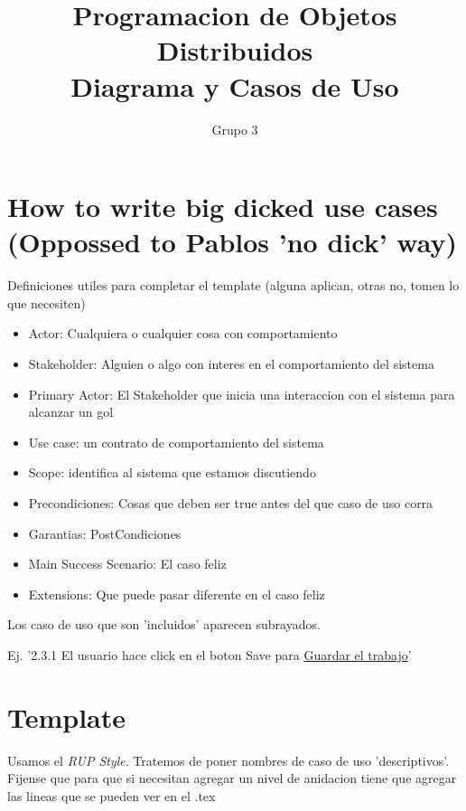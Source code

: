\documentclass[a4paper,11pt]{article}
\title{ Programacion de Objetos Distribuidos \\ Diagrama y Casos de Uso }
\author {Grupo 3}
\date{}
\begin{document}
 

\maketitle
\pagebreak
\section{How to write big dicked use cases (Oppossed to Pablos 'no dick' way)}

Definiciones utiles para completar el template (alguna aplican, otras no, tomen lo que necesiten)

\begin{itemize}
 \item Actor: Cualquiera o cualquier cosa con comportamiento
 \item Stakeholder: Alguien o algo con interes en el comportamiento del sistema
 \item Primary Actor: El Stakeholder que inicia una interaccion con el sistema para alcanzar un gol
 \item Use case: un contrato de comportamiento del sistema
 \item Scope: identifica al sistema que estamos discutiendo
 \item Precondiciones: Cosas que deben ser true antes del que caso de uso corra
 \item Garantias: PostCondiciones
 \item Main Success Scenario: El caso feliz
 \item Extensions: Que puede pasar diferente en el caso feliz
\end{itemize}

Los caso de uso que son 'incluidos' aparecen subrayados.

Ej. '2.3.1 El usuario hace click en el boton Save para \underline{Guardar el trabajo}'

\pagebreak
\section{Template}
Usamos el \emph{RUP Style}. Tratemos de poner nombres de caso de uso 'descriptivos'.
Fijense que para que si necesitan agregar un nivel de anidacion tiene que agregar las lineas que se pueden ver en el .tex

\renewcommand{\theenumi}{\arabic{enumi}.}
\renewcommand{\labelenumi}{\theenumi}
 
\renewcommand{\theenumii}{\arabic{enumii}.}
\renewcommand{\labelenumii}{\theenumii}
\end{document}
